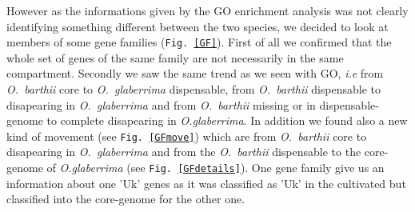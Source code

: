 \documentclass[10pt,letterpaper]{article}
\begin{document}
However as the informations given by the GO enrichment analysis was not clearly identifying something different between the two species, we decided to look at members of some gene families (\texttt{Fig. \ref{GF}}).
First of all we confirmed that the whole set of genes of the same family are not 
necessarily in the same compartment. Secondly we saw the same trend as we seen with GO, \textit{i.e} from 
\emph{O.~barthii} core to \emph{O.~glaberrima} dispensable, from \emph{O.~barthii} dispensable to disapearing in \emph{O.~glaberrima} and from \emph{O.~barthii} missing or in dispensable-genome to complete disapearing in \emph{O.glaberrima}. 
In addition we found also a new kind of movement (see \texttt{Fig.~\ref{GFmove}}) which are from \emph{O.~barthii} core to disapearing in \emph{O.~glaberrima} and from the \emph{O.~barthii} dispensable to the 
core-genome of \emph{O.glaberrima} (see \texttt{Fig.~\ref{GFdetails}}). 
One gene family give us an information about one 'Uk' genes as it was classified as 'Uk' in the cultivated but classified into the core-genome for the other one.

\end{document}
